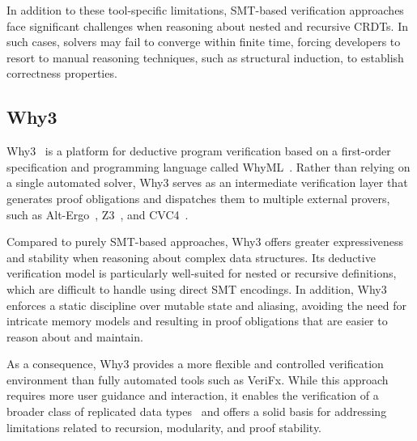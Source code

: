 In addition to these tool-specific limitations, SMT-based verification approaches face significant challenges when reasoning about nested and recursive CRDTs. In such cases, solvers may fail to converge within finite time, forcing developers to resort to manual reasoning techniques, such as structural induction, to establish correctness properties.

\subsection{Why3}
\label{sub:why3}

Why3~\cite{why3} is a platform for deductive program verification based on a first-order specification and programming language called WhyML~\cite{whyml}. Rather than relying on a single automated solver, Why3 serves as an intermediate verification layer that generates proof obligations and dispatches them to multiple external provers, such as Alt-Ergo~\cite{alt-ergo}, Z3~\cite{z3}, and CVC4~\cite{cvc}.

Compared to purely SMT-based approaches, Why3 offers greater expressiveness and stability when reasoning about complex data structures. Its deductive verification model is particularly well-suited for nested or recursive definitions, which are difficult to handle using direct SMT encodings. In addition, Why3 enforces a static discipline over mutable state and aliasing, avoiding the need for intricate memory models and resulting in proof obligations that are easier to reason about and maintain.

As a consequence, Why3 provides a more flexible and controlled verification environment than fully automated tools such as VeriFx. While this approach requires more user guidance and interaction, it enables the verification of a broader class of replicated data types~\cite{meirim2019static} and offers a solid basis for addressing limitations related to recursion, modularity, and proof stability.

\endinput
